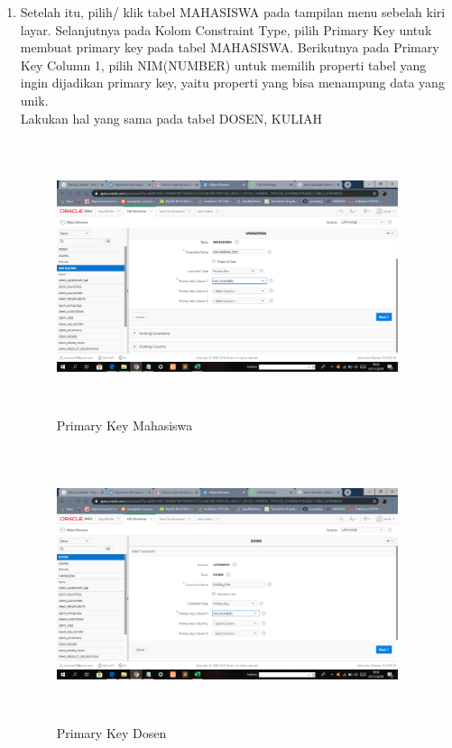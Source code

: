 \begin{enumerate}
\item Setelah itu, pilih/ klik tabel MAHASISWA pada tampilan menu sebelah kiri layar. Selanjutnya pada Kolom Constraint Type, pilih Primary Key untuk membuat primary key pada tabel MAHASISWA. Berikutnya pada Primary Key Column 1, pilih NIM(NUMBER) untuk memilih properti tabel yang ingin dijadikan primary key, yaitu properti yang bisa menampung data yang unik.
\\ Lakukan hal yang sama pada tabel DOSEN, KULIAH

\begin{figure}[!htbp]
\centering
\includegraphics[width=10cm,height=8cm]{figures/16primary_mahasiswa.png}
\caption{Primary Key Mahasiswa}
\label{penanda}
\end{figure}

\begin{figure}[!htbp]
\centering
\includegraphics[width=10cm,height=8cm]{figures/17primary_dosen.png}
\caption{Primary Key Dosen}
\label{penanda}
\end{figure}


\end{enumerate}
